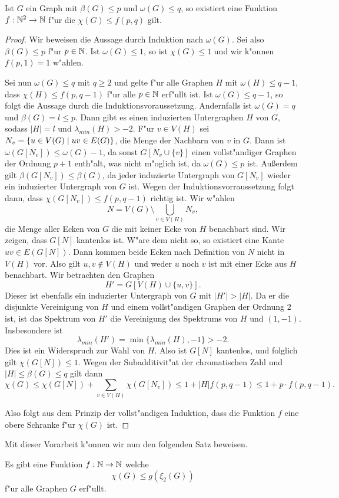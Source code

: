 \begin{lemma}
  Ist $G$ ein Graph mit $\beta(G) \leq p$ und $\omega(G) \leq q$, so existiert eine Funktion $f:{\mathbb{N}} ^{2} \to {\mathbb{N}}$ f"ur die $\chi(G) \leq f(p,q) $ gilt. 
  \label{lem:funktionxilemma}
\end{lemma}
\begin{proof}
  Wir beweisen die Aussage durch Induktion nach $\omega(G)$. Sei also $\beta(G) \leq p$ f"ur $p\in {\mathbb{N}}$. Ist $\omega(G) \leq 1$, so ist $\chi(G) \leq 1$ und wir k"onnen $f(p,1) = 1$ w"ahlen.

  Sei nun $\omega(G) \leq q$ mit $q \geq 2$ und gelte f"ur alle Graphen $H$ mit $\omega(H) \leq q-1$, dass $\chi(H) \leq f(p,q-1)$ f"ur alle $p \in {\mathbb{N}}$ erf"ullt ist.
  Ist $\omega(G) \leq q-1$, so folgt die Aussage durch die Induktionsvoraussetzung. Andernfalls ist $\omega(G) = q$ und $\beta(G) = l \leq p$. Dann gibt es einen induzierten Untergraphen $H$ von $G$, sodass $|H|=l$ und $\lambda_{min}(H)> -2$. F"ur $v\in V(H)$ sei $N_v = \{u\in V(G) \;|\; uv\in E(G) \}$, die Menge der Nachbarn von
  $v$ in $G$. Dann ist $\omega(G[N_v]) \leq \omega(G) -1 $, da sonst $G[N_v\cup \{v\}]$ einen vollst"andiger Graphen der Ordnung $p+1$ enth"alt, was nicht m"oglich ist, da $\omega(G) \leq p$ ist. Au{\ss}erdem gilt $\beta(G[N_v]) \leq \beta(G)$, da jeder induzierte Untergraph von $G[N_v]$ wieder ein induzierter Untergraph von $G$ ist. Wegen der Induktionsvorraussetzung folgt dann, dass $\chi(G[N_v]) \leq f(p,q-1)$ richtig ist. 
  Wir w"ahlen $$N = V(G) \setminus \bigcup\limits_{v\in V(H)} N_v,$$ die Menge aller Ecken von $G$ die mit keiner Ecke von $H$ benachbart sind. Wir zeigen, dass $G[N]$ kantenlos ist. W"are dem nicht so, so existiert eine Kante $uv\in E(G[N])$. 
  Dann kommen beide Ecken nach Definition von $N$ nicht in $V(H)$ vor. 
  Also gilt $u,v\notin V(H)$ und weder $u$ noch $v$ ist mit einer Ecke aus $H$ benachbart. Wir betrachten den Graphen $$H' = G[V(H) \cup \{u,v\}].$$ Dieser ist ebenfalls ein induzierter Untergraph von $G$ mit $|H'| > |H|$. Da er die disjunkte Vereinigung von $H$ und einem vollst"andigen Graphen der Ordnung $2$ ist, ist das Spektrum von $H'$ die Vereinigung des Spektrums von $H$ und $(1,-1)$. Insbesondere ist $$\lambda_{min}(H') = \min \{\lambda_{min}(H), -1\} > -2.$$ 
  Dies ist ein Widerspruch zur Wahl von $H$. Also ist $G[N]$ kantenlos, und folglich gilt $\chi(G[N]) \leq 1$. 
  Wegen der Subadditivit"at der chromatischen Zahl und $|H| \leq \beta(G) \leq q$ gilt dann $$\chi(G) \leq \chi(G[N]) + \sum\limits_{v\in V(H)}\chi(G[N_v]) \leq 1 + |H|f(p,q-1)  \leq 1+p\cdot f(p,q-1).$$

  Also folgt aus dem Prinzip der vollst"andigen Induktion, dass die Funktion $f$ eine obere Schranke f"ur $\chi(G)$ ist.
\end{proof}
Mit dieser Vorarbeit k"onnen wir nun den folgenden Satz beweisen.
\begin{theorem}
  Es gibt eine Funktion $f:{\mathbb{N}} \to {\mathbb{N}}$ welche $$\chi(G) \leq g(\xi_{2}(G))$$ f"ur alle Graphen $G$ erf"ullt. 
  \label{thm:funktionxi}
\end{theorem}

